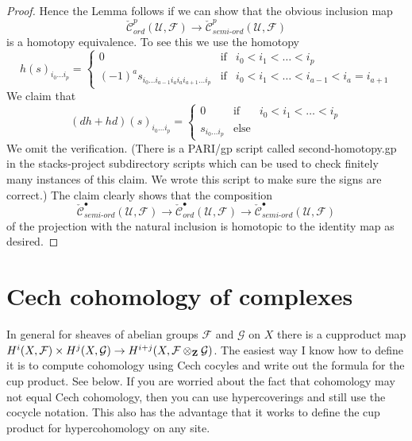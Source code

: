 \begin{proof}
\medskip\noindent
Hence the Lemma follows if we can show that the obvious inclusion map
$$
\check{\mathcal{C}}_{ord}^p(\mathcal{U}, \mathcal{F})
\longrightarrow
\check{\mathcal{C}}_{semi\text{-}ord}^p(\mathcal{U}, \mathcal{F})
$$
is a homotopy equivalence. To see this we use the homotopy
\begin{equation}
\label{equation-second-homotopy}
h(s)_{i_0 \ldots i_p} =
\left\{
\begin{matrix}
0 & \text{if} & i_0 < i_1 < \ldots < i_p \\
(-1)^a s_{i_0 \ldots i_{a - 1} i_a i_a i_{a + 1} \ldots i_p}
& \text{if} & i_0 < i_1 < \ldots < i_{a - 1} < i_a = i_{a + 1}
\end{matrix}
\right.
\end{equation}
We claim that
$$
(dh + hd)(s)_{i_0 \ldots i_p} =
\left\{
\begin{matrix}
0 & \text{if} & i_0 < i_1 < \ldots < i_p \\
s_{i_0 \ldots i_p}
& \text{else} &
\end{matrix}
\right.
$$
We omit the verification. (There is a PARI/gp script called second-homotopy.gp
in the stacks-project subdirectory scripts which can be used to check
finitely many instances of this claim.
We wrote this script to make sure the signs are correct.)
The claim clearly shows that the composition
$$
\check{\mathcal{C}}_{semi\text{-}ord}^\bullet(\mathcal{U}, \mathcal{F})
\longrightarrow
\check{\mathcal{C}}_{ord}^\bullet(\mathcal{U}, \mathcal{F})
\longrightarrow
\check{\mathcal{C}}_{semi\text{-}ord}^\bullet(\mathcal{U}, \mathcal{F})
$$
of the projection with the natural inclusion
is homotopic to the identity map as desired.
\end{proof}









\section{Cech cohomology of complexes}
\label{section-cech-cohomology-of-complexes}

\noindent
In general for sheaves of abelian groups
${\mathcal F}$ and ${\mathcal G}$ on $X$ there is a cupproduct map
$H^i(X, {\mathcal F}) \times H^j(X, {\mathcal G}) \to
H^{i + j}(X, {\mathcal F}\otimes_{\bf Z} {\mathcal G})$. The easiest way
I know how to define it is to compute cohomology using Cech
cocyles and write out the formula for the cup product. See below.
If you are worried about the fact that cohomology may not
equal Cech cohomology, then you can use hypercoverings and still
use the cocycle notation. This also has the advantage that
it works to define the cup product for hypercohomology on any site.

